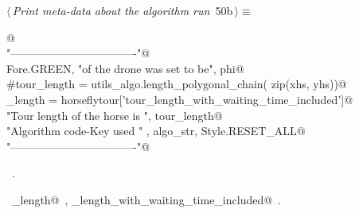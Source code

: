 \documentclass[11.5pt]{report}
\begin{document}
\vspace{-0.8cm} \newchunk
\begin{flushleft} \small
\begin{minipage}{\linewidth}\label{scrap79}\raggedright\small
{} $\langle\,${\itshape Print meta-data about the algorithm run}\nobreak\ {\footnotesize {50b}}$\,\rangle\equiv$
\vspace{-1ex}
\begin{list}{}{} \item
\mbox{}\verb@   @\\
\mbox{}\verb@print "----------------------------------"@\\
\mbox{}\verb@print Fore.GREEN, "\nSpeed of the drone was set to be", phi@\\
\mbox{}\verb@#tour_length = utils_algo.length_polygonal_chain( zip(xhs, yhs))@\\
\mbox{}\verb@tour_length = horseflytour['tour_length_with_waiting_time_included']@\\
\mbox{}\verb@print "Tour length of the horse is ",  tour_length@\\
\mbox{}\verb@print "Algorithm code-Key used "    , algo_str, Style.RESET_ALL@\\
\mbox{}\verb@print "----------------------------------\n"@\\
\mbox{}\verb@@{\NWsep}
\end{list}
\vspace{-1.5ex}
\footnotesize
\begin{list}{}{\setlength{\itemsep}{-\parsep}\setlength{\itemindent}{-\leftmargin}}
\item \NWtxtMacroRefIn\ .
\item \NWtxtIdentsUsed\nobreak\  \verb@tour_length@\nobreak\ , \verb@tour_length_with_waiting_time_included@\nobreak\ .
\item{}
\end{list}
\end{minipage}\vspace{4ex}
\end{flushleft}
\end{document}
